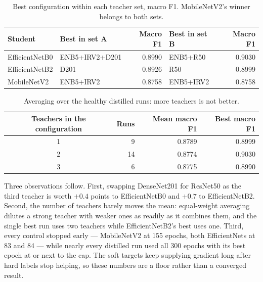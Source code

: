 \documentclass[10pt,letterpaper]{article}
\begin{document}
\begin{table}[H]
\centering
\small
\caption{Best configuration within each teacher set, macro F1. MobileNetV2's winner belongs to both sets.}
\begin{tabular}{@{}llrlr@{}}
\toprule
Student & Best in set A & Macro F1 & Best in set B & Macro F1 \\
\midrule
EfficientNetB0 & ENB5+IRV2+D201 & 0.8990 & ENB5+R50 & 0.9030 \\
EfficientNetB2 & D201 & 0.8926 & R50 & 0.8999 \\
MobileNetV2 & ENB5+IRV2 & 0.8758 & ENB5+IRV2 & 0.8758 \\
\bottomrule
\end{tabular}
\end{table}

\begin{table}[H]
\centering
\small
\caption{Averaging over the healthy distilled runs: more teachers is not better.}
\begin{tabular}{@{}crrr@{}}
\toprule
Teachers in the configuration & Runs & Mean macro F1 & Best macro F1 \\
\midrule
1 & 9 & 0.8789 & 0.8999 \\
2 & 14 & 0.8774 & 0.9030 \\
3 & 6 & 0.8775 & 0.8990 \\
\bottomrule
\end{tabular}
\end{table}

Three observations follow. First, swapping DenseNet201 for ResNet50 as the third teacher is worth
$+0.4$ points to EfficientNetB0 and $+0.7$ to EfficientNetB2. Second, the number of teachers barely moves the
mean: equal-weight averaging dilutes a strong teacher with weaker ones as readily as it combines them, and
the single best run uses two teachers while EfficientNetB2's best uses one. Third, every control stopped
early --- MobileNetV2 at 155 epochs, both EfficientNets at 83 and 84 --- while nearly every distilled run
used all 300 epochs with its best epoch at or next to the cap. The soft targets keep supplying gradient long
after hard labels stop helping, so these numbers are a floor rather than a converged result.
\end{document}
